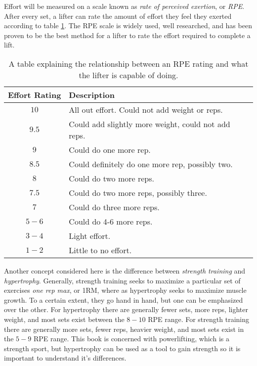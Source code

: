 Effort will be measured on a scale known as \textit{rate of perceived exertion}, or \textit{RPE}. After every set, a lifter can rate the amount of effort they feel they exerted according to table \ref{tab:P1_RPETable}. The RPE scale is widely used, well researched, and has been proven to be the best method for a lifter to rate the effort required to complete a lift. \cite{RPE_ACCURACY}

\begin{table}[h]
    \centering
    \begin{tabular}{c|l}
        Effort Rating & Description \\
        \hline
        $10$ & All out effort. Could not add weight or reps. \\
        $9.5$ & Could add slightly more weight, could not add reps. \\
        $9$ & Could do one more rep. \\
        $8.5$ & Could definitely do one more rep, possibly two. \\
        $8$ & Could do two more reps. \\
        $7.5 $& Could do two more reps, possibly three. \\
        $7$ & Could do three more reps. \\
        $5-6$ & Could do 4-6 more reps. \\
        $3-4$ & Light effort. \\
        $1-2$ & Little to no effort.
    \end{tabular}
    \caption{A table explaining the relationship between an RPE rating and what the lifter is capable of doing.}
    \label{tab:P1_RPETable}
\end{table}

Another concept considered here is the difference between \textit{strength training} and \textit{hypertrophy}. Generally, strength training seeks to maximize a particular set of exercises \textit{one rep max}, or 1RM, where as hypertrophy seeks to maximize muscle growth. To a certain extent, they go hand in hand, but one can be emphasized over the other. For hypertrophy there are generally fewer sets, more reps, lighter weight, and most sets exist between the $8-10$ RPE range. For strength training there are generally more sets, fewer reps, heavier weight, and most sets exist in the $5-9$ RPE range. This book is concerned with powerlifting, which is a strength sport, but hypertrophy can be used as a tool to gain strength so it is important to understand it's differences.

